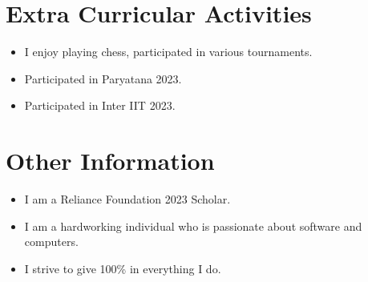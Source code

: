 \documentclass{article}
\begin{document}
	\section*{Extra Curricular Activities}
	\begin{itemize}
		\item I enjoy playing chess, participated in various tournaments.
		\item Participated in Paryatana 2023.
		\item Participated in Inter IIT 2023.
	\end{itemize}
	
	\section*{Other Information}
	\begin{itemize}
		\item I am a Reliance Foundation 2023 Scholar.
	    \item I am a hardworking individual who is passionate about software and computers.
	    \item I strive to give 100\% in everything I do.
    \end{itemize}
	
\end{document}
